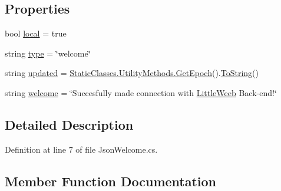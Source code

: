 \subsection*{Properties}
\begin{DoxyCompactItemize}
\item 
bool \mbox{\hyperlink{class_little_weeb_library_1_1_models_1_1_json_welcome_ad8a5e8ff3eb2ced1a8fea61ce161aff6}{local}} = true
\item 
string \mbox{\hyperlink{class_little_weeb_library_1_1_models_1_1_json_welcome_aa19331f4dd36ccf8f06ee8f72116643b}{type}} = \char`\"{}welcome\char`\"{}
\item 
string \mbox{\hyperlink{class_little_weeb_library_1_1_models_1_1_json_welcome_ad3fc6cf68f64e870ffd7cfabf1930e87}{updated}} = \mbox{\hyperlink{class_little_weeb_library_1_1_static_classes_1_1_utility_methods_a12336d9e64983ddabaad8950486fafb2}{Static\+Classes.\+Utility\+Methods.\+Get\+Epoch}}().\mbox{\hyperlink{class_little_weeb_library_1_1_models_1_1_json_welcome_a762f38491c69ca0d0c2c17e4582a145c}{To\+String}}()
\item 
string \mbox{\hyperlink{class_little_weeb_library_1_1_models_1_1_json_welcome_a4ef0527a64420ba1f47304a0a3f02627}{welcome}} = \char`\"{}Succesfully made connection with \mbox{\hyperlink{class_little_weeb_library_1_1_little_weeb}{Little\+Weeb}} Back-\/end!\char`\"{}
\end{DoxyCompactItemize}


\subsection{Detailed Description}


Definition at line 7 of file Json\+Welcome.\+cs.



\subsection{Member Function Documentation}
\mbox{\label{class_little_weeb_library_1_1_models_1_1_json_welcome_a5b3e7dadb2a342808c714b6277a9150d}} 
